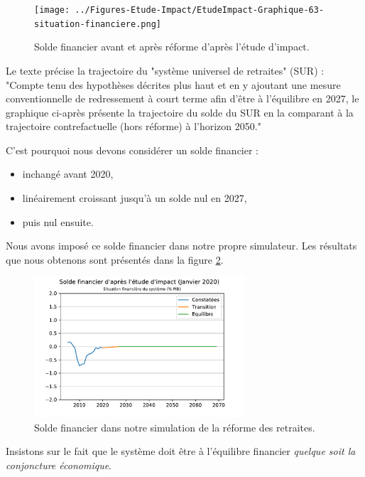 \documentclass[10pt]{article}
\begin{document}
\begin{figure}
\begin{center}
\texttt{[image: ../Figures-Etude-Impact/EtudeImpact-Graphique-63-situation-financiere.png]}
\end{center}
\caption{Solde financier avant et après réforme d'après l'étude d'impact.}
\label{fig-solde-etude-impact}
\end{figure}

Le texte précise la trajectoire du "système universel de retraites" (SUR) : 
"Compte tenu des hypothèses décrites plus haut 
et en y ajoutant une mesure conventionnelle de redressement à court 
terme afin d’être à l’équilibre en 2027, le graphique ci-après présente 
la trajectoire du solde du SUR en la comparant à la trajectoire 
contrefactuelle (hors réforme) à l’horizon 2050."

C'est pourquoi nous devons considérer un solde financier :
\begin{itemize}
\item inchangé avant 2020,
\item linéairement croissant jusqu'à un solde nul en 2027,
\item puis nul ensuite.
\end{itemize}

Nous avons imposé ce solde financier dans notre propre simulateur. 
Les résultats que nous obtenons sont présentés dans la figure \ref{fig-solde-simulation}. 

\begin{figure}
\begin{center}
\includegraphics[width=0.7\textwidth]{Simulation-Solde-Financier.pdf}
\end{center}
\caption{Solde financier dans notre simulation de la réforme des retraites.}
\label{fig-solde-simulation}
\end{figure}

Insistons sur le fait que le système doit être à 
l'équilibre financier \emph{quelque soit la 
conjoncture économique}. 
\end{document}
